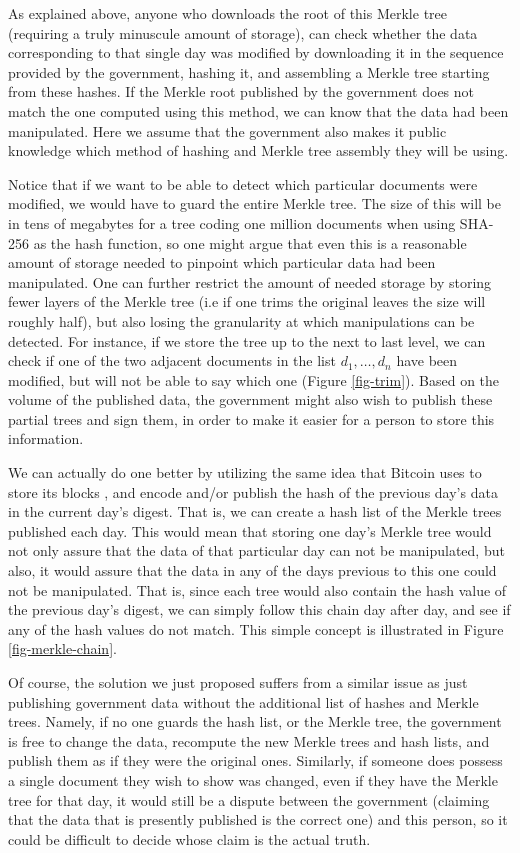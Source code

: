As explained above, anyone who downloads the root of this Merkle tree (requiring a truly minuscule amount of storage), can check whether the data corresponding to that single day was modified by downloading it in the sequence provided by the government, hashing it, and assembling a Merkle tree starting from these hashes. If the Merkle root published by the government does not match the one computed using this method, we can know that the data had been manipulated. Here we assume that the government also makes it public knowledge which method of hashing and Merkle tree assembly they will be using. 

Notice that if we want to be able to detect which particular documents were modified, we would have to guard the entire Merkle tree. The size of this will be in tens of megabytes for a tree coding one million documents when using SHA-256 as the hash function, so one might argue that even this is a reasonable amount of storage needed to pinpoint which particular data had been manipulated. One can further restrict the amount of needed storage by storing fewer layers of the Merkle tree (i.e if one trims the original leaves the size will roughly half), but also losing the granularity at which manipulations can be detected. For instance, if we store the tree up to the next to last level, we can check if one of the two adjacent documents in the list $d_1,\ldots ,d_n$ have been modified, but will not be able to say which one (Figure \ref{fig-trim}). Based on the volume of the published data, the government might also wish to publish these partial trees and sign them, in order to make it easier for a person to store this information.

We can actually do one better by utilizing the same idea that Bitcoin uses to store its blocks \cite{whitepaper}, and encode and/or publish the hash of the previous day's data in the current day's digest. That is, we can create a hash list of the Merkle trees published each day. This would mean that storing one day's Merkle tree would not only assure that the data of that particular day can not be manipulated, but also, it would assure that the data in any of the days previous to this one could not be manipulated.  That is, since each tree would also contain the hash value of the previous day's digest, we can simply follow this chain day after day, and see if any of the hash values do not match. This simple concept is illustrated in Figure \ref{fig-merkle-chain}.


\medskip
{} Of course, the solution we just proposed suffers from a similar issue as just publishing government data without the additional list of hashes and Merkle trees. Namely, if no one guards the hash list, or the Merkle tree, the government is free to change the data, recompute the new Merkle trees and hash lists, and publish them as if they were the original ones. Similarly, if someone does possess a single document they wish to show was changed, even if they have the Merkle tree for that day, it would still be a dispute between the government (claiming that the data that is presently published is the correct one) and this person, so it could be difficult to decide whose claim is the actual truth.

